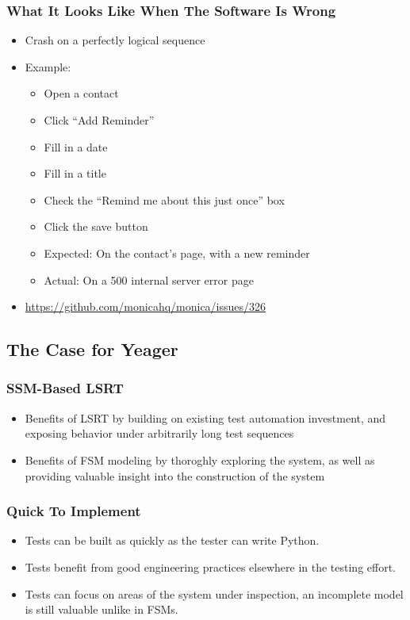 \begin{frame}
  \frametitle{What It Looks Like When The Software Is Wrong}
  \begin{itemize}
    \item Crash on a perfectly logical sequence
    \item Example:
    \begin{itemize}
      \item Open a contact
      \item Click ``Add Reminder''
      \item Fill in a date
      \item Fill in a title
      \item Check the ``Remind me about this just once'' box
      \item Click the save button
      \item Expected: On the contact's page, with a new reminder
      \item Actual: On a 500 internal server error page
    \end{itemize}
    \item \url{https://github.com/monicahq/monica/issues/326}
  \end{itemize}
\end{frame}

\subsection{The Case for Yeager}

\begin{frame}
  \frametitle{SSM-Based LSRT}
  \begin{itemize}
    \item Benefits of LSRT by building on existing test automation investment, and exposing behavior under arbitrarily long test sequences
    \item Benefits of FSM modeling by thoroghly exploring the system, as well as providing valuable insight into the construction of the system
  \end{itemize}
\end{frame}

\begin{frame}
  \frametitle{Quick To Implement}
  \begin{itemize}
    \item Tests can be built as quickly as the tester can write Python.
    \item Tests benefit from good engineering practices elsewhere in the testing effort.
    \item Tests can focus on areas of the system under inspection, an incomplete model is still valuable unlike in FSMs.
  \end{itemize}
\end{frame}

